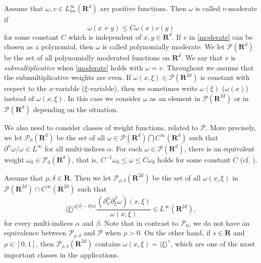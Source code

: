 \documentclass[12pt,a4paper,reqno]{amsart}
\numberwithin{equation}{section}
\numberwithin{thm}{section}
\theoremstyle{definition}
\theoremstyle{remark}
\begin{document}
\par

Assume that $\omega, v\in L^\infty _{loc}({\mathbf R^{d}})$ are positive
functions. Then $\omega$ is called $v$-moderate if
\begin{equation}\label{moderate}
\omega (x+y) \leq C\omega (x)v(y)
\end{equation}
for some constant $C$ which is independent of $x,y\in {\mathbf R^{d}}$. If $v$
in \eqref{moderate} can be chosen as a polynomial, then $\omega$ is
called polynomially moderate. We let $\mathscr P({\mathbf R^{d}})$ be the set
of all polynomially moderated functions on ${\mathbf R^{d}}$. We say that $v$ is
\emph{submultiplicative} when \eqref{moderate} holds with $\omega =v$.
Throughout we assume that the submultiplicative weights are even.
If $\omega (x,\xi )\in \mathscr P({\mathbf R^{{2d}}})$ is constant with respect
to the $x$-variable ($\xi$-variable), then we sometimes write $\omega
(\xi )$ ($\omega (x)$) instead of $\omega (x,\xi )$. In this case we
consider $\omega$ as an element in $\mathscr P({\mathbf R^{{2d}}})$ or in
$\mathscr P({\mathbf R^{d}})$ depending on the situation.

\par

We also need to consider classes of weight functions, related to
$\mathscr P$. More precisely, we let $\mathscr P_0({\mathbf R^{d}})$ be the set
of all $\omega \in \mathscr P({\mathbf R^{d}})\bigcap C^\infty ({\mathbf R^{d}})$ such
that $\partial ^\alpha \omega /\omega \in L^\infty$ for all
multi-indices $\alpha$.
For each $\omega \in \mathscr P({\mathbf R^{d}})$, there is an equivalent
weight $\omega _0\in \mathscr P_0({\mathbf R^{d}})$, that is,
$C^{-1}\omega _0\le \omega \le C\omega _0$ holds for some constant
$C$ (cf. \cite[Lemma 1.2]{To8}).

\par

Assume that $\rho ,\delta \in \mathbf R$. Then we let $\mathscr
P_{\rho ,\delta}({\mathbf R^{{2d}}})$ be the set of all $\omega (x,\xi )$ in
$\mathscr P({\mathbf R^{{2d}}})\cap C^\infty ({\mathbf R^{{2d}}})$ such that
$$
{\langle \xi\rangle} ^{\rho |\beta |-\delta |\alpha |}\frac {(\partial ^\alpha
_x\partial ^\beta _\xi \omega )(x,\xi )}{\omega (x,\xi )}\in L^\infty
({\mathbf R^{{2d}}}),
$$
for every multi-indices $\alpha$ and $\beta$. Note that in contrast to
$\mathscr P_0$, we do not have an equivalence between $\mathscr
P_{\rho ,\delta}$ and $\mathscr P$ when $\rho >0$. On the other hand,
if $s\in \mathbf R$ and $\rho \in [0,1]$, then $\mathscr P_{\rho
,\delta} ({\mathbf R^{{2d}}})$ contains $\omega (x,\xi )={\langle \xi\rangle} ^s$, which
are one of the most important classes in the applications.
\end{document}
